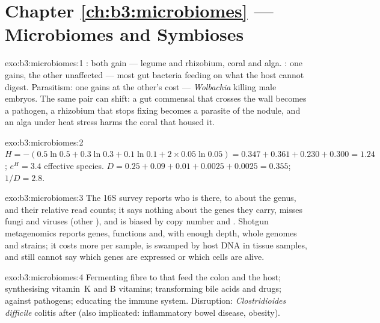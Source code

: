 \section*{Chapter \ref{ch:b3:microbiomes} --- Microbiomes and Symbioses}

\begin{solution}{exo:b3:microbiomes:1}
: both gain --- legume and rhizobium, coral and alga.
: one gains, the other unaffected --- most gut bacteria
feeding on what the host cannot digest. Parasitism: one gains at the
other's cost --- \emph{Wolbachia} killing male embryos. The same pair
can shift: a gut commensal that crosses the wall becomes a pathogen, a
rhizobium that stops fixing becomes a parasite of the nodule, and an
alga under heat stress harms the coral that housed it.
\end{solution}

\begin{solution}{exo:b3:microbiomes:2}
$H = -(0.5\ln 0.5 + 0.3\ln 0.3 + 0.1\ln 0.1 + 2\times 0.05\ln 0.05) =
0.347 + 0.361 + 0.230 + 0.300 = 1.24$; $e^{H} = 3.4$ effective
species. $D = 0.25 + 0.09 + 0.01 + 0.0025 + 0.0025 = 0.355$; $1/D =
2.8$.
\end{solution}

\begin{solution}{exo:b3:microbiomes:3}
The 16S survey reports who is there, to about the genus, and their
relative read counts; it says nothing about the genes they carry,
misses fungi and viruses (other ), and is biased by copy number
and . Shotgun metagenomics reports genes, functions and, with
enough depth, whole genomes and strains; it costs more per sample, is
swamped by host DNA in tissue samples, and still cannot say which genes
are expressed or which cells are alive.
\end{solution}

\begin{solution}{exo:b3:microbiomes:4}
Fermenting fibre to  that feed the colon and
the host; synthesising vitamin~K and B vitamins; transforming bile
acids and drugs;  against pathogens; educating
the immune system. Disruption: \emph{Clostridioides difficile} colitis
after  (also implicated: inflammatory bowel disease,
obesity).
\end{solution}

